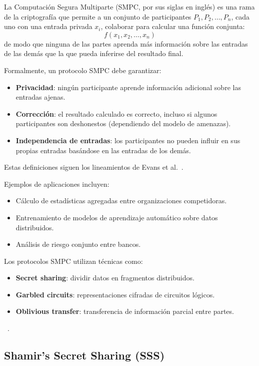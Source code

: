 \documentclass{article}
\begin{document}
La Computación Segura Multiparte (SMPC, por sus siglas en inglés) es una rama de la criptografía que permite a un conjunto de participantes \( P_1, P_2, \ldots, P_n \), cada uno con una entrada privada \( x_i \), colaborar para calcular una función conjunta:
\[
f(x_1, x_2, \ldots, x_n)
\]
de modo que ninguna de las partes aprenda más información sobre las entradas de las demás que la que pueda inferirse del resultado final.

Formalmente, un protocolo SMPC debe garantizar:
\begin{itemize}
    \item \textbf{Privacidad}: ningún participante aprende información adicional sobre las entradas ajenas.
    \item \textbf{Corrección}: el resultado calculado es correcto, incluso si algunos participantes son deshonestos (dependiendo del modelo de amenazas).
    \item \textbf{Independencia de entradas}: los participantes no pueden influir en sus propias entradas basándose en las entradas de los demás.
\end{itemize}

Estas definiciones siguen los lineamientos de Evans et al.~\cite{evans2018}.

Ejemplos de aplicaciones incluyen:
\begin{itemize}
    \item Cálculo de estadísticas agregadas entre organizaciones competidoras.
    \item Entrenamiento de modelos de aprendizaje automático sobre datos distribuidos.
    \item Análisis de riesgo conjunto entre bancos.
\end{itemize}

Los protocolos SMPC utilizan técnicas como:
\begin{itemize}
    \item \textbf{Secret sharing}: dividir datos en fragmentos distribuidos.
    \item \textbf{Garbled circuits}: representaciones cifradas de circuitos lógicos.
    \item \textbf{Oblivious transfer}: transferencia de información parcial entre partes.
\end{itemize} ~\cite{evans2018}.

\subsection{Shamir’s Secret Sharing (SSS)}
\end{document}

